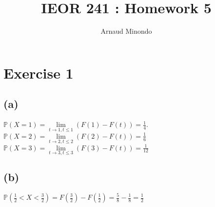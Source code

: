 \documentclass{article}
\title{IEOR 241 : Homework 5}
\author{Arnaud Minondo}
\begin{document}
    \maketitle
    \section*{Exercise 1}
    \subsection*{(a)}
    $\mathbb{P}(X=1) = \lim\limits_{t\to1, t\leq 1}(F(1)-F(t)) = \frac{1}{4}$.
    \\
    $\mathbb{P}(X=2) = \lim\limits_{t\to 2, t\leq 2}(F(2)-F(t)) = \frac{1}{6}$
    \\
    $\mathbb{P}(X=3) = \lim\limits_{t\to 3, t\leq 3}(F(3)-F(t)) = \frac{1}{12}$
    \subsection*{(b)}
    $\mathbb{P}(\frac{1}{2}<X<\frac{3}{2}) = F(\frac{3}{2}) - F(\frac{1}{2}) = \frac{5}{8} - \frac{1}{8} = \frac{1}{2}$
\end{document}
